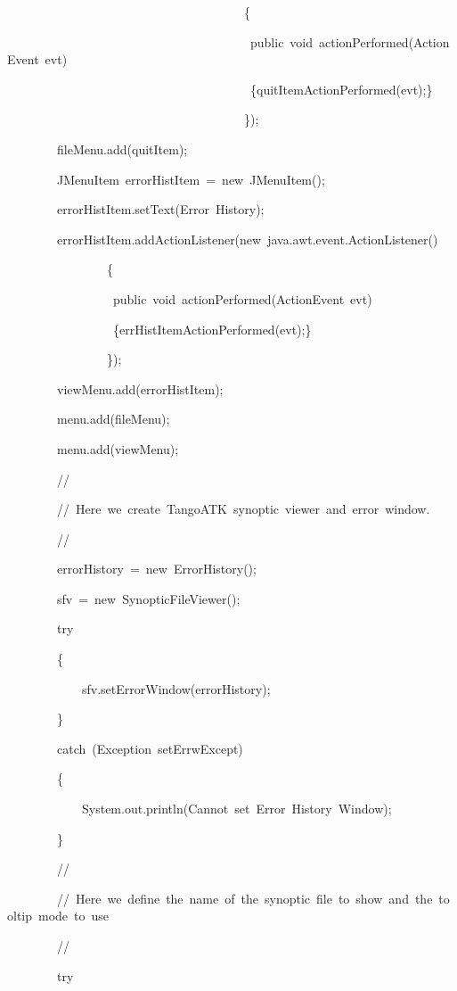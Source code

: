 \begin{lyxcode}
~~~~~~~~~~~~~~~~~~~~~~~~~~~~~~~~~~~~~~\{~~~~~~~~~~~~~~~~~

~~~~~~~~~~~~~~~~~~~~~~~~~~~~~~~~~~~~~~~public~void~actionPerformed(ActionEvent~evt)

~~~~~~~~~~~~~~~~~~~~~~~~~~~~~~~~~~~~~~~\{quitItemActionPerformed(evt);\}

~~~~~~~~~~~~~~~~~~~~~~~~~~~~~~~~~~~~~~\});

~~~~~~~~fileMenu.add(quitItem);

~~~~~~~~JMenuItem~errorHistItem~=~new~JMenuItem();

~~~~~~~~errorHistItem.setText(\textquotedbl{}Error~History\textquotedbl{});

~~~~~~~~errorHistItem.addActionListener(new~java.awt.event.ActionListener()

~~~~~~~~~~~~~~~~\{~~~~~~~~~~~~~~~~~

~~~~~~~~~~~~~~~~~public~void~actionPerformed(ActionEvent~evt)

~~~~~~~~~~~~~~~~~\{errHistItemActionPerformed(evt);\}

~~~~~~~~~~~~~~~~\});

~~~~~~~~viewMenu.add(errorHistItem);

~~~~~~~~menu.add(fileMenu);

~~~~~~~~menu.add(viewMenu);

~~~~~~~~//

~~~~~~~~//~Here~we~create~TangoATK~synoptic~viewer~and~error~window.

~~~~~~~~//

~~~~~~~~errorHistory~=~new~ErrorHistory();

~~~~~~~~sfv~=~new~SynopticFileViewer();

~~~~~~~~try

~~~~~~~~\{

~~~~~~~~~~~~sfv.setErrorWindow(errorHistory);

~~~~~~~~\}

~~~~~~~~catch~(Exception~setErrwExcept)

~~~~~~~~\{

~~~~~~~~~~~~System.out.println(\textquotedbl{}Cannot~set~Error~History~Window\textquotedbl{});

~~~~~~~~\}

~~~~~~~~//~~~~~~

~~~~~~~~//~Here~we~define~the~name~of~the~synoptic~file~to~show~and~the~tooltip~mode~to~use

~~~~~~~~//~~~~~~~~

~~~~~~~~try


\end{lyxcode}
